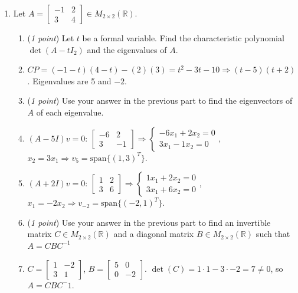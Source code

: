 \documentclass[11pt]{article}
\newcommand{\bbR}{\mathbb{R}}
\theoremstyle{definition}
\numberwithin{equation}{subsection}
\begin{document}
\begin{enumerate}
\begin{enumerate}
\item (\emph{2 points}) If possible, diagonalize $A$ over $\mathbb{R}$. If this is not possible, then explain why not.
\item[] To be diagonalizable, the sum of dimensions of eigenspaces must equal the size of $A$ (4). Since $\dim E_2=2$ and $\dim E_3=1$, for a total of 3 linearly independent eigenvectors in the combined eigenspace, $A$ is not diagonalizable over $\bbR$. 

\end{enumerate}

\item Let $A=\begin{bmatrix} -1 & 2\\ 3 & 4\end{bmatrix} \in M_{2\times 2}(\bbR)$.

\begin{enumerate}

\item(\emph{1 point}) Let $t$ be a formal variable. Find the characteristic polynomial $\det(A-tI_2)$ and the eigenvalues of $A$.
\item[] $CP=(-1-t)(4-t)-(2)(3)=t^2-3t-10\Rightarrow(t-5)(t+2)$. Eigenvalues are 5 and $-2$.

\item (\emph{1 point}) Use your answer in the previous part to find the eigenvectors of $A$ of each eigenvalue.
\item[] $(A-5I)v=0$: $\begin{bmatrix}
    -6&2\\3&-1
\end{bmatrix}\Rightarrow\begin{cases}
    -6x_1+2x_2=0\\3x_1-1x_2=0
\end{cases}$, $x_2=3x_1\Rightarrow v_5=\text{span}\{(1,3)^T\}$.
\item[] $(A+2I)v=0$: $\begin{bmatrix}
    1&2\\3&6
\end{bmatrix}\Rightarrow\begin{cases}
    1x_1+2x_2=0\\3x_1+6x_2=0
\end{cases}$, $x_1=-2x_2\Rightarrow v_{-2}=\text{span}\{(-2,1)^T\}$.

\item (\emph{1 point}) Use your answer in the previous part to find an invertible matrix $C \in M_{2\times 2}(\bbR)$ and a diagonal matrix $B \in M_{2\times 2}(\bbR)$ such that $A=CBC^{-1}$
\item[] $C=\begin{bmatrix}
    1&-2\\3&1
\end{bmatrix}$, $B=\begin{bmatrix}
    5&0\\0&-2
\end{bmatrix}$. $\det(C)=1\cdot1-3\cdot-2=7\neq0$, so $A=CBC^-1$.


\end{enumerate}
\end{enumerate}
\end{document}
